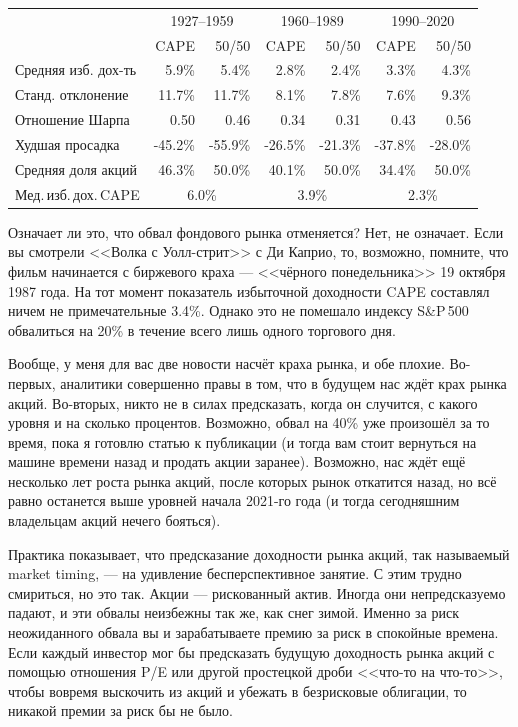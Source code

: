 \begin{table}[ht]
\centering
\begin{tabular}{l|r|r|r|r|r|r}
& \multicolumn{2}{c|}{1927--1959} & \multicolumn{2}{c|}{1960--1989} & \multicolumn{2}{c}{1990--2020} \\ 
\cline{2-7}
                       & CAPE    & 50/50   & CAPE    & 50/50   & CAPE    & 50/50 \\ \hline
Средняя изб. дох-ть    & 5.9\%   & 5.4\%   & 2.8\%   & 2.4\%   & 3.3\%   & 4.3\%   \\
Станд. отклонение      & 11.7\%  & 11.7\%  & 8.1\%   & 7.8\%   & 7.6\%   & 9.3\%   \\
Отношение Шарпа        & 0.50    & 0.46    & 0.34    & 0.31    & 0.43    & 0.56    \\
Худшая просадка        & -45.2\% & -55.9\% & -26.5\% & -21.3\% & -37.8\% & -28.0\% \\
Средняя доля акций     & 46.3\%  & 50.0\%  & 40.1\%  & 50.0\%  & 34.4\%  & 50.0\%  \\ 
\cline{2-7}
Мед.\,изб.\,дох.\,CAPE & \multicolumn{2}{c|}{6.0\%} & \multicolumn{2}{c|}{3.9\%} & \multicolumn{2}{c}{2.3\%} 
\end{tabular}
\end{table}


Означает ли это, что обвал фондового рынка отменяется? Нет, не означает. Если вы смотрели <<Волка с Уолл-стрит>> с Ди Каприо, то, возможно, помните, что фильм начинается с биржевого краха --- <<чёрного понедельника>> 19 октября 1987 года. На тот момент показатель избыточной доходности CAPE составлял ничем не примечательные 3.4\%. Однако это не помешало индексу S\&P\,500 обвалиться на 20\% в течение всего лишь одного торгового дня. 


Вообще, у меня для вас две новости насчёт краха рынка, и обе плохие. Во-первых, аналитики совершенно правы в том, что в будущем нас ждёт крах рынка акций. Во-вторых, никто не в силах предсказать, когда он случится, с какого уровня и на сколько процентов. Возможно, обвал на 40\% уже произошёл за то время, пока я готовлю статью к публикации (и тогда вам стоит вернуться на машине времени назад и продать акции заранее). Возможно, нас ждёт ещё несколько лет роста рынка акций, после которых рынок откатится назад, но всё равно останется выше уровней начала 2021-го года (и тогда сегодняшним владельцам акций нечего бояться).

Практика показывает, что предсказание доходности рынка акций, так называемый market timing, --- на удивление бесперспективное занятие. С этим трудно смириться, но это так. Акции --- рискованный актив. Иногда они непредсказуемо падают, и эти обвалы неизбежны так же, как снег зимой. Именно за риск неожиданного обвала вы и зарабатываете премию за риск в спокойные времена. Если каждый инвестор мог бы предсказать будущую доходность рынка акций с помощью отношения P/E или другой простецкой дроби <<что-то на что-то>>, чтобы вовремя выскочить из акций и убежать в безрисковые облигации, то никакой премии за риск бы не было.

